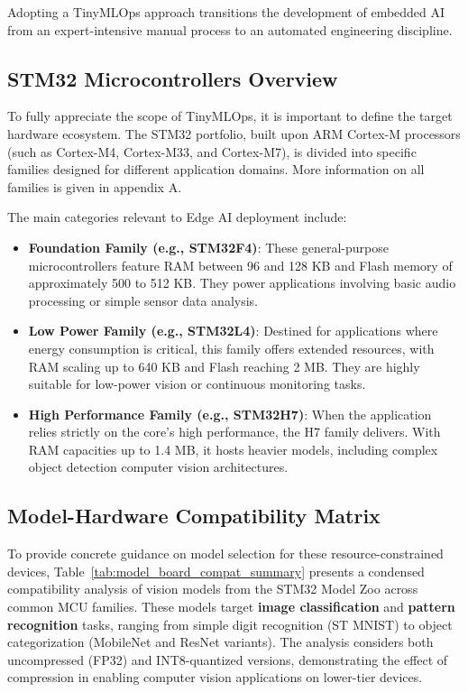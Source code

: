 Adopting a TinyMLOps approach transitions the development of embedded AI from an expert-intensive manual process to an automated engineering discipline.

\subsection{STM32 Microcontrollers Overview}

To fully appreciate the scope of TinyMLOps, it is important to define the target hardware ecosystem. The STM32 portfolio, built upon ARM Cortex-M processors (such as Cortex-M4, Cortex-M33, and Cortex-M7), is divided into specific families designed for different application domains. More information on all families is given in appendix A.

The main categories relevant to Edge AI deployment include:

\begin{itemize}
    \item \textbf{Foundation Family (e.g., STM32F4)}: These general-purpose microcontrollers feature RAM between 96 and 128 KB and Flash memory of approximately 500 to 512 KB. They power applications involving basic audio processing or simple sensor data analysis.
    \item \textbf{Low Power Family (e.g., STM32L4)}: Destined for applications where energy consumption is critical, this family offers extended resources, with RAM scaling up to 640 KB and Flash reaching 2 MB. They are highly suitable for low-power vision or continuous monitoring tasks.
    \item \textbf{High Performance Family (e.g., STM32H7)}: When the application relies strictly on the core's high performance, the H7 family delivers. With RAM capacities up to 1.4 MB, it hosts heavier models, including complex object detection computer vision architectures.
\end{itemize}

\subsection{Model-Hardware Compatibility Matrix}
To provide concrete guidance on model selection for these resource-constrained devices, Table~\ref{tab:model_board_compat_summary} presents a condensed compatibility analysis of vision models from the STM32 Model Zoo across common MCU families. These models target \textbf{image classification} and \textbf{pattern recognition} tasks, ranging from simple digit recognition (ST MNIST) to object categorization (MobileNet and ResNet variants). The analysis considers both uncompressed (FP32) and INT8-quantized versions, demonstrating the effect of compression in enabling computer vision applications on lower-tier devices.

